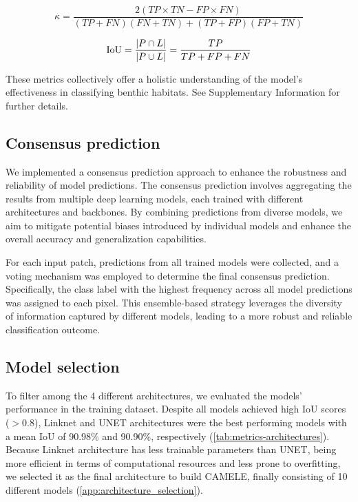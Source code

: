 \begin{equation}\label{eq:kappa}
    \kappa=\frac{2\left(TP\times TN - FP\times FN\right)}{(TP + FN)(FN + TN) +
        (TP + FP)(FP
        + TN)}
\end{equation}

\begin{equation}\label{eq:IoU}
    \text{IoU} = \frac{\abs{P\cap L}}{\abs{P\cup L}}=\frac{TP}{TP + FP + FN}
\end{equation}

These metrics collectively offer a holistic understanding of the model's
effectiveness in classifying benthic habitats. See Supplementary Information
for further details.

\subsection{Consensus prediction}

We implemented a consensus prediction approach to enhance the robustness and
reliability of model predictions. The consensus prediction involves aggregating
the results from multiple deep learning models, each trained with different
architectures and backbones. By combining predictions from diverse models, we
aim to mitigate potential biases introduced by individual models and enhance
the overall accuracy and generalization capabilities.

For each input patch, predictions from all trained models were collected, and a
voting mechanism was employed to determine the final consensus prediction.
Specifically, the class label with the highest frequency across all model
predictions was assigned to each pixel. This ensemble-based strategy
leverages the diversity of information captured by different models, leading to
a more robust and reliable classification outcome.

\subsection{Model selection}

To filter among the 4 different architectures, we evaluated the models'
performance in the training dataset. Despite all models achieved high IoU
scores ($> 0.8$), Linknet and UNET architectures were the best performing
models with a mean IoU of 90.98\% and 90.90\%, respectively
(\cref{tab:metrics-architectures}). Because Linknet architecture has less
trainable parameters than UNET, being more efficient in terms of computational
resources and less prone to overfitting, we selected it as the final
architecture to build CAMELE, finally consisting of 10 different models
(\cref{app:architecture_selection}).


